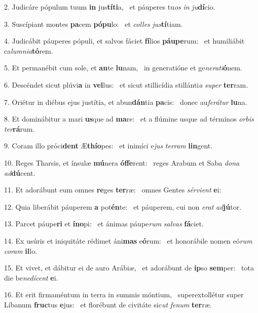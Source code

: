 2. Judicáre pópulum tuum \textbf{in} jus\textbf{tí}\textbf{ti}a, \ast\  et páuperes tu\textit{os} \textit{in} \textit{ju}\textbf{dí}cio.\

3. Suscípiant montes \textbf{pa}cem \textbf{pó}\textbf{pu}lo: \ast\  et \textit{col}\textit{les} \textit{jus}\textbf{tí}tiam.\

4. Judicábit páuperes pópuli, et salvos fáciet \textbf{fí}lios \textbf{páu}\textbf{pe}rum: \ast\  et humiliábit ca\textit{lum}\textit{ni}\textit{a}\textbf{tó}rem.\

5. Et permanébit cum sole, et \textbf{an}te \textbf{lu}nam, \ast\  in generatióne et ge\textit{ne}\textit{ra}\textit{ti}\textbf{ó}nem.\

6. Descéndet sicut plúvi\textbf{a} in \textbf{vel}lus: \ast\  et sicut stillicídia stillánti\textit{a} \textit{su}\textit{per} \textbf{ter}ram.\

7. Oriétur in diébus ejus justítia, et abun\textbf{dán}tia \textbf{pa}cis: \ast\  donec au\textit{fe}\textit{rá}\textit{tur} \textbf{lu}na.\

8. Et dominábitur a mari \textbf{us}que ad \textbf{ma}re: \ast\  et a flúmine usque ad términos \textit{or}\textit{bis} \textit{ter}\textbf{rá}rum.\

9. Coram illo próci\textbf{dent} Æ\textbf{thí}\textbf{o}pes: \ast\  et inimíci e\textit{jus} \textit{ter}\textit{ram} \textbf{lin}gent.\

10. Reges Tharsis, et ínsulæ \textbf{mú}nera \textbf{óf}\textbf{fe}rent: \ast\  reges Arabum et Saba \textit{do}\textit{na} \textit{ad}\textbf{dú}cent.\

11. Et adorábunt eum omnes \textbf{re}ges \textbf{ter}ræ: \ast\  omnes Gentes \textit{sér}\textit{vi}\textit{ent} \textbf{e}i:\

12. Quia liberábit páuperem \textbf{a} pot\textbf{én}te: \ast\  et páuperem, cui non \textit{e}\textit{rat} \textit{ad}\textbf{jú}tor.\

13. Parcet páupe\textbf{ri} et \textbf{ín}\textbf{o}pi: \ast\  et ánimas páupe\textit{rum} \textit{sal}\textit{vas} \textbf{fá}ciet.\

14. Ex usúris et iniquitáte rédimet áni\textbf{mas} e\textbf{ó}rum: \ast\  et honorábile nomen eó\textit{rum} \textit{co}\textit{ram} \textbf{il}lo.\

15. Et vivet, et dábitur ei de auro Arábiæ, \dag\  et adorábunt de \textbf{ip}so \textbf{sem}per: \ast\  tota die be\textit{ne}\textit{dí}\textit{cent} \textbf{e}i.\

16. Et erit firmaméntum in terra in summis móntium, \dag\  superextollétur super Líbanum \textbf{fruc}tus \textbf{e}jus: \ast\  et florébunt de civitáte sic\textit{ut} \textit{fe}\textit{num} \textbf{ter}ræ.\

